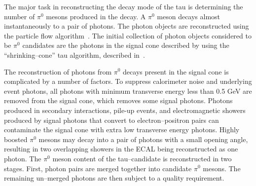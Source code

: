 The major task in reconstructing the decay mode of the tau is determining the
number of $\pi^0$ mesons produced in the decay.  A $\pi^0$ meson decays almost
instantaneously to a pair of photons.  The photon objects are reconstructed using the
particle flow algorithm~\cite{CMS-PAS-PFT-09-001}. The initial collection of
photon objects considered to be $\pi^0$ candidates are the photons in the signal
cone described by using the ``shrinking--cone'' tau algorithm, described
in~\cite{CMS-PAS-PFT-08-001}.  

The reconstruction of photons from $\pi^0$ decays present in the signal cone is
complicated by a number of factors.  To suppress calorimeter noise and underlying
event photons, all photons with minimum transverse energy less than 0.5 GeV are
removed from the signal cone, which removes some signal photons.  Photons
produced in secondary interactions, pile-up events, and electromagnetic showers
produced by signal photons that convert to electron--positron pairs can
contaminate the signal cone with extra low transverse energy photons.  Highly
boosted $\pi^0$ mesons may decay into a pair of photons with a small opening
angle, resulting in two overlapping showers in the ECAL being reconstructed as
one photon.  The $\pi^0$ meson content of the tau--candidate is reconstructed in
two stages.  First, photon pairs are merged together into candidate $\pi^0$
mesons.  The remaining un--merged photons are then subject to a quality
requirement.
